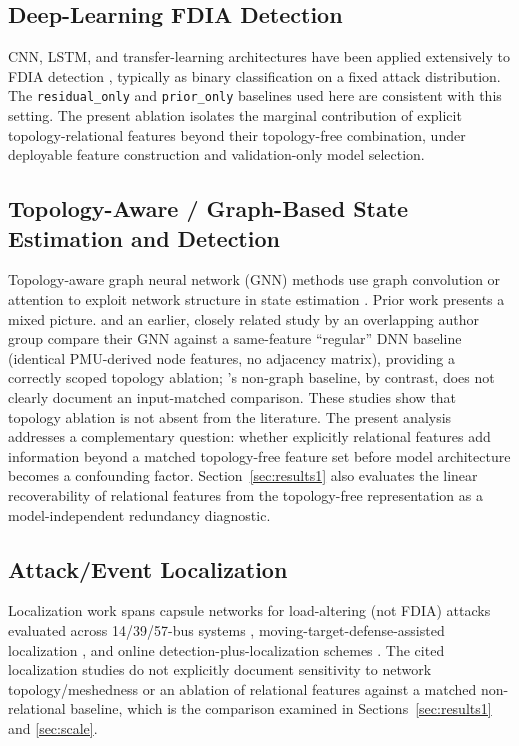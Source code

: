 \documentclass[conference]{IEEEtran}
\begin{document}
\subsection{Deep-Learning FDIA Detection}
CNN, LSTM, and transfer-learning architectures have been applied extensively to FDIA detection \cite{niu2018dynamic,li2021adversarial,xu2021detecting}, typically as binary classification on a fixed attack distribution. The \texttt{residual\_only} and \texttt{prior\_only} baselines used here are consistent with this setting. The present ablation isolates the marginal contribution of explicit topology-relational features beyond their topology-free combination, under deployable feature construction and validation-only model selection.

\subsection{Topology-Aware / Graph-Based State Estimation and Detection}
Topology-aware graph neural network (GNN) methods use graph convolution or attention to exploit network structure in state estimation \cite{moshtagh2025topology,moshtagh2022timesync,suri2025powergnn,yaniv2026robust}. Prior work presents a mixed picture. \cite{moshtagh2025topology} and an earlier, closely related study by an overlapping author group \cite{moshtagh2022timesync} compare their GNN against a same-feature ``regular'' DNN baseline (identical PMU-derived node features, no adjacency matrix), providing a correctly scoped topology ablation; \cite{suri2025powergnn}'s non-graph baseline, by contrast, does not clearly document an input-matched comparison. These studies show that topology ablation is not absent from the literature. The present analysis addresses a complementary question: whether explicitly relational features add information beyond a matched topology-free feature set before model architecture becomes a confounding factor. Section~\ref{sec:results1} also evaluates the linear recoverability of relational features from the topology-free representation as a model-independent redundancy diagnostic.

\subsection{Attack/Event Localization}
Localization work spans capsule networks for load-altering (not FDIA) attacks evaluated across 14/39/57-bus systems \cite{jahangir2022localizing}, moving-target-defense-assisted localization \cite{chen2022localization}, and online detection-plus-localization schemes \cite{li2021online}. The cited localization studies do not explicitly document sensitivity to network topology/meshedness or an ablation of relational features against a matched non-relational baseline, which is the comparison examined in Sections~\ref{sec:results1} and \ref{sec:scale}.
\end{document}
